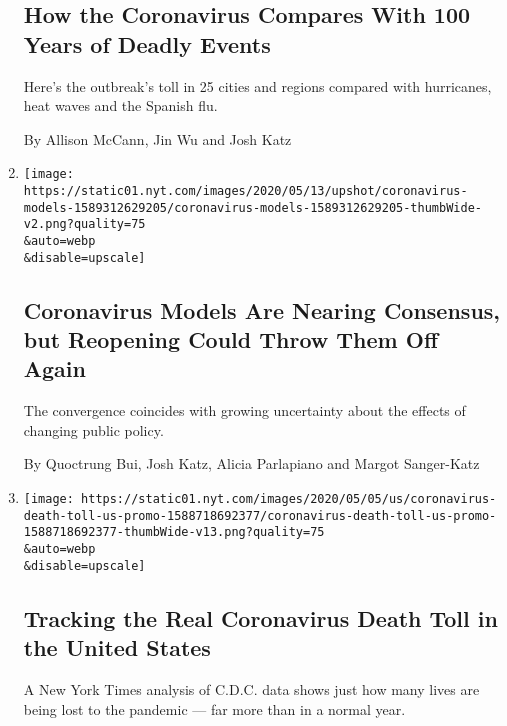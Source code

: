 \begin{enumerate}
{  \subsection{How the Coronavirus Compares With 100 Years of Deadly
  Events}\label{how-the-coronavirus-compares-with-100-years-of-deadly-events}}

  Here's the outbreak's toll in 25 cities and regions compared with
  hurricanes, heat waves and the Spanish flu.

  By Allison McCann, Jin Wu and Josh Katz
\item
  \href{/interactive/2020/05/12/upshot/coronavirus-models.html}{}

  \texttt{[image: https://static01.nyt.com/images/2020/05/13/upshot/coronavirus-models-1589312629205/coronavirus-models-1589312629205-thumbWide-v2.png?quality=75\\\&auto=webp\\\&disable=upscale]}

  \hypertarget{coronavirus-models-are-nearing-consensus-but-reopening-could-throw-them-off-again}{%
  \subsection{Coronavirus Models Are Nearing Consensus, but Reopening
  Could Throw Them Off
  Again}\label{coronavirus-models-are-nearing-consensus-but-reopening-could-throw-them-off-again}}

  The convergence coincides with growing uncertainty about the effects
  of changing public policy.

  By Quoctrung Bui, Josh Katz, Alicia Parlapiano and Margot Sanger-Katz
\item
  \href{/interactive/2020/05/05/us/coronavirus-death-toll-us.html}{}

  \texttt{[image: https://static01.nyt.com/images/2020/05/05/us/coronavirus-death-toll-us-promo-1588718692377/coronavirus-death-toll-us-promo-1588718692377-thumbWide-v13.png?quality=75\\\&auto=webp\\\&disable=upscale]}

  \hypertarget{tracking-the-real-coronavirus-death-toll-in-the-united-states}{%
  \subsection{Tracking the Real Coronavirus Death Toll in the United
  States}\label{tracking-the-real-coronavirus-death-toll-in-the-united-states}}

  A New York Times analysis of C.D.C. data shows just how many lives are
  being lost to the pandemic --- far more than in a normal year.


\end{enumerate}
